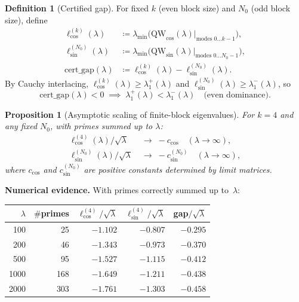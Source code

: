 \documentclass[12pt,a4paper]{article}
\newtheorem{proposition}[theorem]{Proposition}
\theoremstyle{definition}
\newtheorem{definition}[theorem]{Definition}
\theoremstyle{remark}
\begin{document}
\begin{definition}[Certified gap]
For fixed $k$ (even block size) and $N_0$ (odd block size), define
\begin{align*}
  \ell_{\cos}^{(k)}(\lambda) &\coloneqq \lambda_{\min}\!\bigl(\mathrm{QW}_{\cos}(\lambda)\big|_{\text{modes }0\ldots k-1}\bigr), \\
  \ell_{\sin}^{(N_0)}(\lambda) &\coloneqq \lambda_{\min}\!\bigl(\mathrm{QW}_{\sin}(\lambda)\big|_{\text{modes }0\ldots N_0-1}\bigr), \\
  \mathrm{cert\_gap}(\lambda) &\coloneqq \ell_{\cos}^{(k)}(\lambda) - \ell_{\sin}^{(N_0)}(\lambda).
\end{align*}
By Cauchy interlacing, $\ell_{\cos}^{(k)}(\lambda) \geq \lambda_1^+(\lambda)$ and $\ell_{\sin}^{(N_0)}(\lambda) \geq \lambda_1^-(\lambda)$, so
\[
  \mathrm{cert\_gap}(\lambda) < 0 \;\implies\; \lambda_1^+(\lambda) < \lambda_1^-(\lambda) \quad\text{(even dominance).}
\]
\end{definition}

\begin{proposition}[Asymptotic scaling of finite-block eigenvalues]
\label{prop:scaling}
For $k = 4$ and any fixed $N_0$, with primes summed up to $\lambda$:
\begin{align}
  \ell_{\cos}^{(4)}(\lambda) / \sqrt{\lambda} &\;\to\; -c_{\cos} \quad (\lambda \to \infty), \label{eq:ccos-limit} \\
  \ell_{\sin}^{(N_0)}(\lambda) / \sqrt{\lambda} &\;\to\; -c_{\sin}^{(N_0)} \quad (\lambda \to \infty), \label{eq:csin-limit}
\end{align}
where $c_{\cos}$ and $c_{\sin}^{(N_0)}$ are positive constants determined by limit matrices.
\end{proposition}

\noindent\textbf{Numerical evidence.} With primes correctly summed up to~$\lambda$:

\begin{center}
\renewcommand{\arraystretch}{1.15}
\begin{tabular}{r|r|r|r|r}
$\lambda$ & $\#$primes & $\ell_{\cos}^{(4)}/\sqrt{\lambda}$ & $\ell_{\sin}^{(4)}/\sqrt{\lambda}$ & gap$/\sqrt{\lambda}$ \\\hline
100  & 25  & $-1.102$ & $-0.807$ & $-0.295$ \\
200  & 46  & $-1.343$ & $-0.973$ & $-0.370$ \\
500  & 95  & $-1.527$ & $-1.115$ & $-0.412$ \\
1000 & 168 & $-1.649$ & $-1.211$ & $-0.438$ \\
2000 & 303 & $-1.761$ & $-1.303$ & $-0.458$
\end{tabular}
\end{center}
\end{document}
